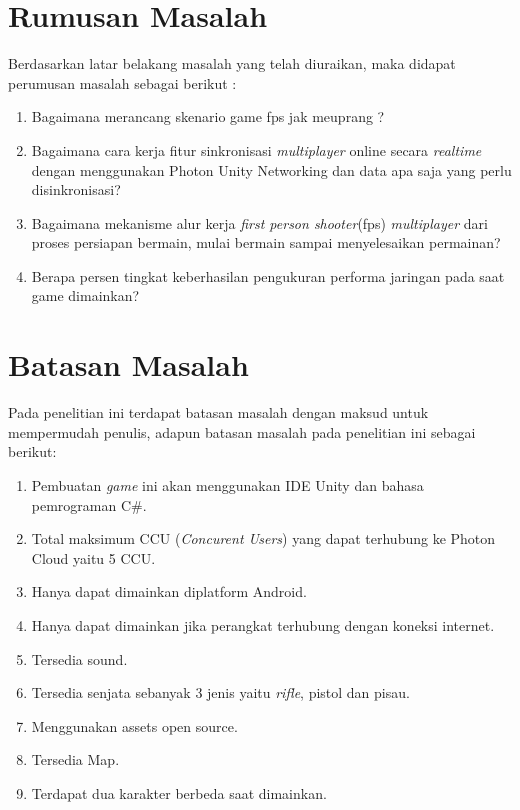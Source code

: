 \section{Rumusan Masalah}
\noindent

Berdasarkan latar belakang masalah yang telah diuraikan, maka didapat perumusan masalah sebagai berikut :
\begin{enumerate}
	\item Bagaimana merancang skenario game fps jak meuprang ?
	\item Bagaimana cara kerja fitur sinkronisasi \textit{multiplayer} online secara \textit{realtime} dengan menggunakan Photon Unity Networking dan data apa saja yang perlu disinkronisasi?
	\item Bagaimana mekanisme alur kerja \textit{first person shooter}(fps) \textit{multiplayer} dari proses persiapan bermain, mulai bermain sampai menyelesaikan permainan?
	\item Berapa persen tingkat keberhasilan pengukuran performa jaringan pada saat game dimainkan?
\end{enumerate}

\section{Batasan Masalah}
\noindent

Pada penelitian ini terdapat batasan masalah dengan maksud untuk mempermudah penulis, adapun batasan masalah pada penelitian ini sebagai berikut:
\begin{enumerate}
	\item Pembuatan \textit{\textit{game}} ini akan menggunakan IDE Unity dan bahasa pemrograman C\#.
	\item Total maksimum CCU (\textit{Concurent Users}) yang dapat terhubung ke Photon Cloud yaitu 5 CCU.
	\item Hanya dapat dimainkan diplatform Android.
	\item Hanya dapat dimainkan jika perangkat terhubung dengan koneksi internet.
	\item Tersedia sound.
	\item Tersedia senjata sebanyak 3 jenis yaitu \textit{rifle}, pistol dan pisau.
	\item Menggunakan assets open source.
	\item Tersedia Map.
	\item Terdapat dua karakter berbeda saat dimainkan.
\end{enumerate}

